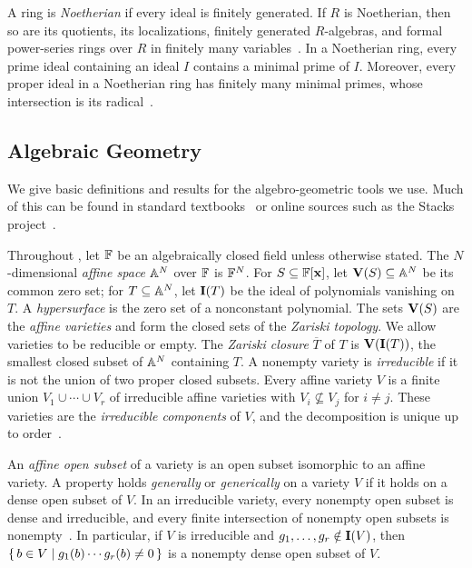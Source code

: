 \documentclass[11pt,letterpaper,dvipsnames]{article}
\begin{document}
A ring is \emph{Noetherian} if every ideal is finitely generated.
If $R$ is Noetherian, then so are its quotients, its localizations, finitely generated $R$-algebras, and formal power-series rings over $R$ in finitely many variables~\cite[Propositions~7.1 and~7.3, Corollary~7.7, and Corollary~10.27]{AM69}.
In a Noetherian ring, every prime ideal containing an ideal $I$ contains a minimal prime of $I$.
Moreover, every proper ideal in a Noetherian ring has finitely many minimal primes, whose intersection is its radical~\cite[Proposition~4.6 and Theorem~7.13]{AM69}.

\subsection{Algebraic Geometry}\label{sec:prelim-ag}

We give basic definitions and results for the algebro-geometric tools we use.
Much of this can be found in standard textbooks~\cite{Har77, Sha13, CLO25, BCS97, HP94} or online sources such as the Stacks project~\cite{stacks-project}.

Throughout , let $\mathbb{F}$ be an algebraically closed field unless otherwise stated.
The $N$-dimensional \emph{affine space} $\mathbb{A}^N$ over $\mathbb{F}$ is $\mathbb{F}^N$.
For $S \subseteq \F[\vec{x}]$, let $\operatorname{\mathbf{V}}(S) \subseteq \mathbb{A}^N$ be its common zero set; for $T\subseteq\mathbb{A}^N$, let $\operatorname{\mathbf{I}}(T)$ be the ideal of polynomials vanishing on $T$. 
A \emph{hypersurface} is the zero set of a nonconstant polynomial.
The sets $\operatorname{\mathbf{V}}(S)$ are the \emph{affine varieties} and form the closed sets of the \emph{Zariski topology}.
We allow varieties to be reducible or empty.
The \emph{Zariski closure} $\overline{T}$ of $T$ is $\operatorname{\mathbf{V}}(\operatorname{\mathbf{I}}(T))$, the smallest closed subset of $\mathbb{A}^N$ containing $T$.
A nonempty variety is \emph{irreducible} if it is not the union of two proper closed subsets. 
Every affine variety $V$ is a finite union $V_1 \cup \cdots \cup V_r$ of irreducible affine varieties with $V_i \not\subseteq V_j$ for $i \neq j$.
These varieties are the \emph{irreducible components} of $V$, and the decomposition is unique up to order~\cite[Chapter~4, \S6, Theorem~4]{CLO25}.

An \emph{affine open subset} of a variety is an open subset isomorphic to an affine variety.
A property holds \emph{generally} or \emph{generically} on a variety $V$ if it holds on a dense open subset of $V$.
In an irreducible variety, every nonempty open subset is dense and irreducible, and every finite intersection of nonempty open subsets is nonempty~\cite[Chapter~I, Exercise~1.6]{Har77}.
In particular, if $V$ is irreducible and $g_1,\ldots,g_r\notin\operatorname{\mathbf{I}}(V)$, then $\set{b \in V | g_1(b) \cdots g_r(b) \neq 0}$ is a nonempty dense open subset of $V$.
\end{document}
